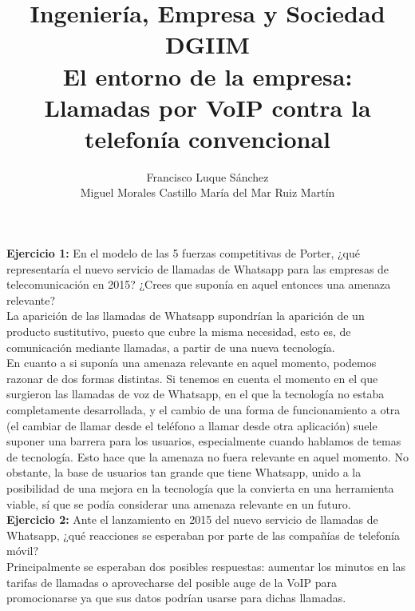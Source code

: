 \documentclass[11pt]{article}
\theoremstyle{plain}
\theoremstyle{definition}
\begin{document}
\title{Ingeniería, Empresa y Sociedad \\
  DGIIM \\
  \large El entorno de la empresa: Llamadas por VoIP contra la
  telefonía convencional }
\author{Francisco Luque Sánchez\\
  Miguel Morales Castillo María del Mar Ruiz Martín}

\maketitle

\textbf{Ejercicio 1:} En el modelo de las 5 fuerzas competitivas de
Porter, ¿qué representaría el nuevo servicio de llamadas de Whatsapp
para las empresas de telecomunicación en 2015? ¿Crees que suponía en
aquel entonces una amenaza relevante?\\

La aparición de las llamadas de Whatsapp supondrían la aparición de un
producto sustitutivo, puesto que cubre la misma necesidad, esto es,
de comunicación mediante llamadas, a partir de una nueva tecnología.\\

En cuanto a si suponía una amenaza relevante en aquel momento, podemos
razonar de dos formas distintas. Si tenemos en cuenta el momento en el
que surgieron las llamadas de voz de Whatsapp, en el que la tecnología
no estaba completamente desarrollada, y el cambio de una forma de
funcionamiento a otra (el cambiar de llamar desde el teléfono a llamar
desde otra aplicación) suele suponer una barrera para los usuarios,
especialmente cuando hablamos de temas de tecnología. Esto hace que la
amenaza no fuera relevante en aquel momento. No obstante, la base de
usuarios tan grande que tiene Whatsapp, unido a la posibilidad de una
mejora en la tecnología que la convierta en una herramienta viable, sí
que se podía considerar una amenaza relevante en un futuro.\\

\textbf{Ejercicio 2:} Ante el lanzamiento en 2015 del nuevo servicio
de llamadas de Whatsapp, ¿qué reacciones se esperaban por parte de las
compañías de telefonía móvil?\\

Principalmente se esperaban dos posibles respuestas: aumentar los
minutos en las tarifas de llamadas o aprovecharse del posible auge de
la VoIP para promocionarse ya que sus datos podrían usarse para
dichas llamadas.\\
\end{document}
